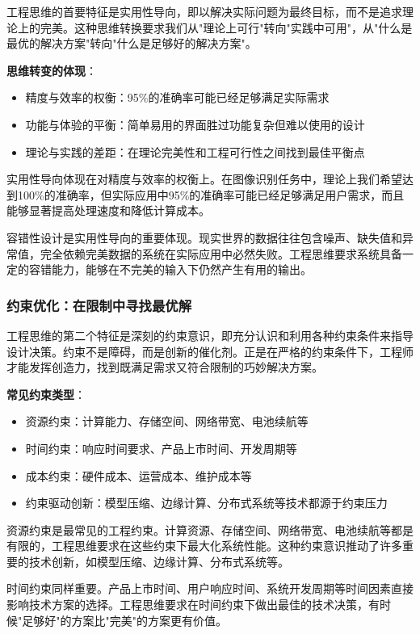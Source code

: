 工程思维的首要特征是实用性导向，即以解决实际问题为最终目标，而不是追求理论上的完美。这种思维转换要求我们从"理论上可行"转向"实践中可用"，从"什么是最优的解决方案"转向"什么是足够好的解决方案"。

\textbf{思维转变的体现}：
\begin{itemize}
\item 精度与效率的权衡：95\%的准确率可能已经足够满足实际需求
\item 功能与体验的平衡：简单易用的界面胜过功能复杂但难以使用的设计
\item 理论与实践的差距：在理论完美性和工程可行性之间找到最佳平衡点
\end{itemize}

实用性导向体现在对精度与效率的权衡上。在图像识别任务中，理论上我们希望达到100\%的准确率，但实际应用中95\%的准确率可能已经足够满足用户需求，而且能够显著提高处理速度和降低计算成本。

容错性设计是实用性导向的重要体现。现实世界的数据往往包含噪声、缺失值和异常值，完全依赖完美数据的系统在实际应用中必然失败。工程思维要求系统具备一定的容错能力，能够在不完美的输入下仍然产生有用的输出。

\subsubsection{约束优化：在限制中寻找最优解}

工程思维的第二个特征是深刻的约束意识，即充分认识和利用各种约束条件来指导设计决策。约束不是障碍，而是创新的催化剂。正是在严格的约束条件下，工程师才能发挥创造力，找到既满足需求又符合限制的巧妙解决方案。

\textbf{常见约束类型}：
\begin{itemize}
\item 资源约束：计算能力、存储空间、网络带宽、电池续航等
\item 时间约束：响应时间要求、产品上市时间、开发周期等
\item 成本约束：硬件成本、运营成本、维护成本等
\item 约束驱动创新：模型压缩、边缘计算、分布式系统等技术都源于约束压力
\end{itemize}

资源约束是最常见的工程约束。计算资源、存储空间、网络带宽、电池续航等都是有限的，工程思维要求在这些约束下最大化系统性能。这种约束意识推动了许多重要的技术创新，如模型压缩、边缘计算、分布式系统等。

时间约束同样重要。产品上市时间、用户响应时间、系统开发周期等时间因素直接影响技术方案的选择。工程思维要求在时间约束下做出最佳的技术决策，有时候"足够好"的方案比"完美"的方案更有价值。

